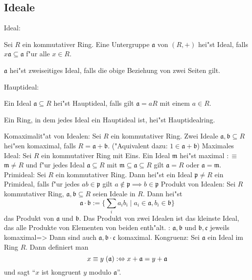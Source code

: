 \subsection{Ideale}
 Ideal:{
  Sei $R$ ein kommutativer Ring. Eine Untergruppe $\mathfrak a$ von $(R,+)$
  hei"st Ideal, falls $x\mathfrak a\subseteq \mathfrak a$ f"ur alle $x\in R$.
  
  $\mathfrak a$ hei"st zweiseitiges Ideal, falls die obige Beziehung von
  zwei Seiten gilt.
  
  }
 Hauptideal:{
  Ein Ideal $\mathfrak a\subseteq R$ hei"st Hauptideal, falls 
  gilt $\mathfrak a=aR$ mit einem $a\in R$.

  Ein Ring, in dem jedes Ideal ein Hauptideal ist, hei"st Hauptidealring.
  }
 Komaximalit"at von Idealen:{
  Sei $R$ ein kommutativer Ring. Zwei Ideale 
  $\mathfrak a,\mathfrak b\subseteq R$ hei"sen 
  komaximal, falls $R=\mathfrak a+\mathfrak b$. 
  ("Aquivalent dazu: $1\in\mathfrak a+\mathfrak b$)
  }
 Maximales Ideal:{
  Sei $R$ ein kommutativer Ring mit Eins.
  Ein Ideal $\mathfrak m$ hei"st maximal $:\equiv$ $\mathfrak m\ne R$ und
  f"ur jedes Ideal $\mathfrak a\subseteq R$ mit 
  $\mathfrak m\subseteq \mathfrak a\subseteq R$ gilt $\mathfrak a=R$ oder
  $\mathfrak a=\mathfrak m$.
  }
 Primideal:{
  Sei $R$ ein kommutativer Ring. Dann hei"st ein Ideal $\mathfrak p\ne R$ 
  ein Primideal, falls f"ur jedes $ab\in\mathfrak p$ gilt 
  $a\not\in\mathfrak p\implies b\in\mathfrak p$
  }
 Produkt von Idealen:{
  Sei $R$ kommutativer Ring, $\mathfrak a,\mathfrak b\subseteq R$ seien 
  Ideale in $R$. Dann hei"st
  \[\mathfrak a\cdot\mathfrak b:=\{\sum_i a_ib_i\mid a_i\in\mathfrak a,b_i\in\mathfrak b\}
    \]
  das Produkt von $\mathfrak a$ und $\mathfrak b$. Das Produkt von zwei
  Idealen ist das kleinste Ideal, das alle Produkte von Elementen von beiden
  enth"alt.
  }
\theorem: $\mathfrak a,\mathfrak b$ und $\mathfrak b,\mathfrak c$ jeweils 
  komaximal=>{
  Dann sind auch $\mathfrak a,\mathfrak b\cdot\mathfrak c$ komaximal.
  }
 Kongruenz:{
  Sei $\mathfrak a$ ein Ideal im Ring $R$. Dann definiert man
  \[x\ident y \; (\mathfrak a):\equiv x+\mathfrak a=y+\mathfrak a
    \]
  und sagt ``$x$ ist kongruent $y$ modulo $\mathfrak a$''.
  }

